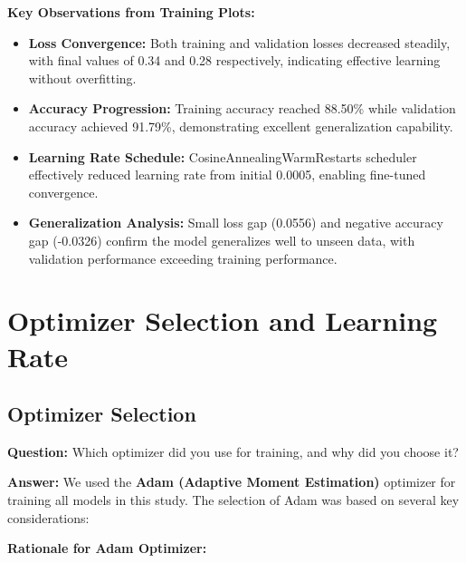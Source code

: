 \documentclass[12pt,a4paper]{article}
\begin{document}
\textbf{Key Observations from Training Plots:}
\begin{itemize}
    \item \textbf{Loss Convergence:} Both training and validation losses decreased steadily, with final values of 0.34 and 0.28 respectively, indicating effective learning without overfitting.
    \item \textbf{Accuracy Progression:} Training accuracy reached 88.50\% while validation accuracy achieved 91.79\%, demonstrating excellent generalization capability.
    \item \textbf{Learning Rate Schedule:} CosineAnnealingWarmRestarts scheduler effectively reduced learning rate from initial 0.0005, enabling fine-tuned convergence.
    \item \textbf{Generalization Analysis:} Small loss gap (0.0556) and negative accuracy gap (-0.0326) confirm the model generalizes well to unseen data, with validation performance exceeding training performance.
\end{itemize}

\section{Optimizer Selection and Learning Rate}

\subsection{Optimizer Selection}

\textbf{Question:} Which optimizer did you use for training, and why did you choose it?

\textbf{Answer:} We used the \textbf{Adam (Adaptive Moment Estimation)} optimizer for training all models in this study. The selection of Adam was based on several key considerations:

\textbf{Rationale for Adam Optimizer:}
\end{document}
